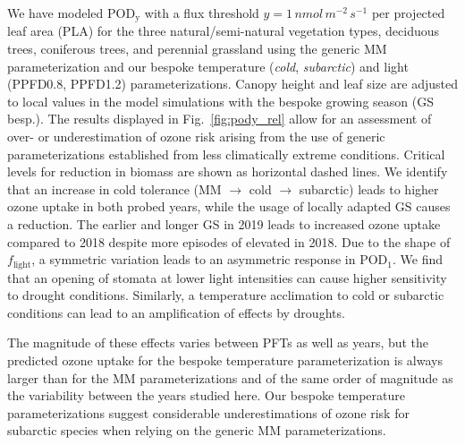 \documentclass[bg, manuscript]{copernicus}
\begin{document}
We have modeled $\mathrm{POD_y}$ with a flux threshold $y=1\,\unit{nmol\,m^{-2}\,s^{-1}}$ per projected leaf area (PLA) for the three natural/semi-natural vegetation types, deciduous trees, coniferous trees, and perennial grassland using the generic MM parameterization and our bespoke temperature (\emph{cold}, \emph{subarctic}) and light (PPFD0.8, PPFD1.2) parameterizations. Canopy height and leaf size are adjusted to local values in the model simulations with the bespoke growing season (GS besp.). The results displayed in Fig.~\ref{fig:pody_rel} allow for an assessment of over- or underestimation of ozone risk arising from the use of generic parameterizations established from less climatically extreme conditions.
Critical levels for reduction in biomass \citep[deciduous forest $4\,\unit{\%}$, coniferous forest $2\,\unit{\%}$, and grasslands $10\,\unit{\%}$ biomass reduction,][]{ICP:MappingManual2017,ESPR:Hayes2021} are shown as horizontal dashed lines. We identify that an increase in cold tolerance (MM $\rightarrow$ cold $\rightarrow$ subarctic) leads to higher ozone uptake in both probed years, while the usage of locally adapted GS causes a reduction. The earlier and longer GS in 2019 leads to increased ozone uptake compared to 2018 despite more episodes of elevated \chem{[O_3]} in 2018. Due to the shape of $f_\mathrm{light}$, a symmetric variation leads to an asymmetric response in $\mathrm{POD_1}$. We find that an opening of stomata at lower light intensities can cause higher sensitivity to drought conditions. Similarly, a temperature acclimation to cold or subarctic conditions can lead to an amplification of effects by droughts. 

The magnitude of these effects varies between PFTs as well as years, but the predicted ozone uptake for the bespoke temperature parameterization is always larger than for the MM parameterizations and of the same order of magnitude as the variability between the years studied here. Our bespoke temperature parameterizations suggest considerable underestimations of ozone risk for subarctic species when relying on the generic MM parameterizations.
\end{document}
